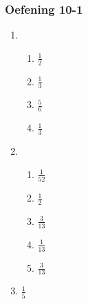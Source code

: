 {\begin{multicols}{3}
\subsubsection*{Oefening 10-1} %
  \begin{enumerate}[noitemsep, label=\textbf{\arabic*}. ]
  \item %
    \begin{enumerate}[itemsep=1pt, label=\textbf{(\alph*)} ]
    \item $\frac{1}{2}$%
    \item $\frac{1}{3}$%
    \item $\frac{5}{6}$%
    \item $\frac{1}{3}$%
    \end{enumerate}
  \item %
    \begin{enumerate}[itemsep=1pt, label=\textbf{(\alph*)} ]
    \item $\frac{1}{52}$%
    \item $\frac{1}{2}$%
    \item $\frac{3}{13}$%
    \item $\frac{1}{13}$%
    \item $\frac{3}{13}$%
    \end{enumerate}
\item $\frac{1}{5}$%

\end{enumerate}



\end{multicols}}
